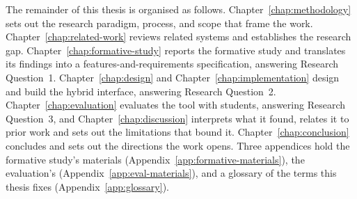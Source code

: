 The remainder of this thesis is organised as follows. Chapter~\ref{chap:methodology} sets out the research paradigm, process, and scope that frame the work. Chapter~\ref{chap:related-work} reviews related systems and establishes the research gap. Chapter~\ref{chap:formative-study} reports the formative study and translates its findings into a features-and-requirements specification, answering Research Question~1. Chapter~\ref{chap:design} and Chapter~\ref{chap:implementation} design and build the hybrid interface, answering Research Question~2. Chapter~\ref{chap:evaluation} evaluates the tool with students, answering Research Question~3, and Chapter~\ref{chap:discussion} interprets what it found, relates it to prior work and sets out the limitations that bound it. Chapter~\ref{chap:conclusion} concludes and sets out the directions the work opens. Three appendices hold the formative study's materials (Appendix~\ref{app:formative-materials}), the evaluation's (Appendix~\ref{app:eval-materials}), and a glossary of the terms this thesis fixes (Appendix~\ref{app:glossary}).
